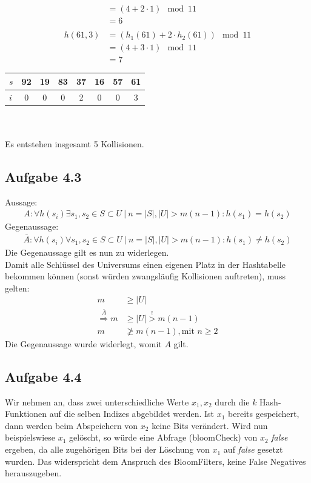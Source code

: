 \documentclass{article}
\begin{document}
\begin{enumerate}
\begin{minipage}[t]{0.4\textwidth}
\begin{align*}
                &= (4 + 2\cdot 1) \mod{11} \\
                &= 6 \\\\
                h(61, 3) &= (h_1(61) + 2\cdot h_2(61)) \mod{11} \\
                &= (4 + 3\cdot 1) \mod{11} \\
                &= 7
            \end{align*} 
            \begin{tabular}{l|ccccccc}
                $s$ & 92 & 19 & 83 & 37 & 16 & 57 & 61 \\ \hline
                $i$ & 0 & 0 & 0 & 2 & 0 & 0 & 3
            \end{tabular} \\\\
            Es entstehen insgesamt 5 Kollisionen. 
        \end{minipage}
    \end{enumerate}


    \subsection*{Aufgabe 4.3}
    Aussage:
    \begin{align*}
        A: \forall h(s_i) \exists s_1, s_2 \in S \subset U \:|\: n = |S|, |U| > m(n-1) : h(s_1) = h(s_2)
    \end{align*}
    Gegenaussage:
    \begin{align*}
        \bar{A}: \forall h(s_i) \forall s_1, s_2 \in S \subset U \:|\: n = |S|, |U| > m(n-1) : h(s_1) \neq h(s_2)
    \end{align*}
    Die Gegenaussage gilt es nun zu widerlegen. \\
    Damit alle Schlüssel des Universums einen eigenen Platz in der Hashtabelle bekommen können (sonst würden zwangsläufig Kollisionen auftreten),
    muss gelten: 
    \begin{align*}
        m &\ge |U| \\
        \stackrel{\bar{A}}{\Rightarrow} m &\ge |U| \stackrel{!}{>} m(n-1) \\
        m &\ngeq m(n-1), \text{mit } n \ge 2
    \end{align*}
    Die Gegenaussage wurde widerlegt, womit $A$ gilt. 


    \subsection*{Aufgabe 4.4}
    Wir nehmen an, dass zwei unterschiedliche Werte $x_1, x_2$ durch die $k$ Hash-Funktionen auf die selben Indizes abgebildet werden. Ist $x_1$ bereits gespeichert, dann werden beim Abspeichern von $x_2$ keine Bits verändert. Wird nun beispielswiese $x_1$ gelöscht, so würde eine Abfrage (bloomCheck) von $x_2$ \textit{false} ergeben, da alle zugehörigen Bits bei der Löschung von $x_1$ auf \textit{false} gesetzt wurden. Das widerspricht dem Anspruch des BloomFilters, keine False Negatives herauszugeben. 
\end{document}

